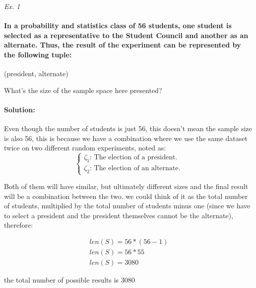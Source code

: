 \documentclass[11pt,fleqn]{book} %
\begin{document}
\textit{Ex. 1}

\paragraph*{In a probability and statistics class of 56 students, one 
student is selected as a representative to the Student Council and 
another as an alternate. Thus, the result of the experiment can be 
represented by the following tuple:}

\begin{center}
    (president, alternate)    
\end{center}

What's the size of the sample space here presented?

\paragraph{Solution:}

Even though the number of students is just 56, this doesn't mean the sample size is also
56, this is because we have a combination where we use the same dataset twice on two 
different random experiments, noted as:
$$
\begin{cases}
    \zeta_1 \text{: The election of a president.}\\
    \zeta_2 \text{: The election of an alternate.}
\end{cases}
$$

Both of them will have similar, but ultimately different sizes and the final result will be a combination
between the two. we could think of it as the total number of students, multiplied by the total number of
students minus one (since we have to select a president and the president themselves cannot be the alternate), 
therefore:

\begin{gather}
    len(S) = 56 * (56-1) \\
    len(S) = 56 * 55 \\
    len(S) = 3080
\end{gather}

the total number of possible results is 3080
\end{document}
